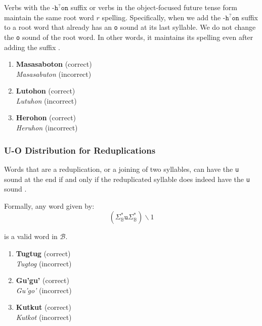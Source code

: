 Verbs with the $\texttt{-h}^?\texttt{on}$ suffix or verbs in the object-focused future tense form maintain the same root word $r$ spelling. Specifically, when we add the $\texttt{-h}^?\texttt{on}$ suffix to a root word that already has an \texttt{o} sound at its last syllable. We do not change the \texttt{o} sound of the root word. In other words, it maintains its spelling even after adding the suffix \cite{bikol_dictionary}.

\begin{example}
\end{example}

\begin{enumerate}
      \item \textbf{Masasaboton} (correct) \\
            \textit{Masasabuton} (incorrect)
      \item \textbf{Lutohon} (correct) \\
            \textit{Lutuhon} (incorrect)
      \item \textbf{Herohon} (correct) \\
            \textit{Heruhon} (incorrect)
\end{enumerate}

\subsubsection{U-O Distribution for Reduplications}

Words that are a reduplication, or a joining of two syllables, can have the \texttt{u} sound at the end if and only if the reduplicated syllable does indeed have the \texttt{u} sound \cite{bikol_dictionary}.

Formally, any word given by:
\[
      \left( \Sigma_\mathbb{B}^*\texttt{u}\Sigma_\mathbb{B}^* \right)\backslash1
\]

is a valid word in $\mathcal{B}$.

\begin{example}
\end{example}

\begin{enumerate}
      \item \textbf{Tugtug} (correct) \\
            \textit{Tugtog} (incorrect)
      \item \textbf{Gu'gu'} (correct)
            \\ \textit{Gu'go'} (incorrect)
      \item \textbf{Kutkut} (correct)
            \\ \textit{Kutkot} (incorrect)
\end{enumerate}